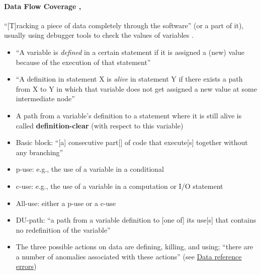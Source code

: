 \paragraph{Data Flow Coverage \citep[p.~114]{Patton2006},
      \citep[pp.~424-425]{vanVliet2000}}
\label{data-flow-coverage}

``[T]racking a piece of data completely through the software'' (or a part of
it), usually using debugger tools to check the values of variables
\citep[p.~114]{Patton2006}.

\begin{itemize}
      \item ``A variable is \emph{defined} in a certain statement if it is
            assigned a (new) value because of the execution of that
            statement'' \citep[p.~424]{vanVliet2000}
      \item ``A definition in statement X is \emph{alive} in statement Y if
            there exists a path from X to Y in which that variable does not
            get assigned a new value at some intermediate node''
            \citep[p.~424]{vanVliet2000}
      \item A path from a variable's definition to a statement where it is
            still alive is called \textbf{definition-clear} (with respect to
            this variable) \citep[p.~424]{vanVliet2000}
      \item Basic block: ``[a] consecutive part[] of code that execute[s]
            together without any branching'' \citep[p.~477]{PetersAndPedrycz2000}
      \item \acf{p-use}: e.g., the use of a variable in a conditional
            \citep[p.~424]{vanVliet2000}
      \item \acf{c-use}: e.g., the use of a variable in a computation or I/O
            statement \citep[p.~424]{vanVliet2000}
      \item All-use: either a \acs{p-use} or a \acs{c-use}~
            \citep[p.~478]{PetersAndPedrycz2000}
      \item DU-path: ``a path from a variable definition to [one of] its use[s]
            that contains no redefinition of the variable''
            \citep[pp.~478-479]{PetersAndPedrycz2000}
      \item The three possible actions on data are defining, killing, and using;
            ``there are a number of anomalies associated with these actions''
            \citep[pp.~478, 480]{PetersAndPedrycz2000}
            (see \hyperref[data-ref-errors]{Data reference errors})
\end{itemize}

